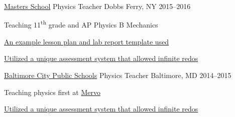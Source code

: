 \begin{cventries}
\cventry
    {\href{mastersny.org}{Masters School}}
    {Physics Teacher}
    {Dobbs Ferry, NY} {2015--2016}
    {
    \begin{cvitems}
      \item {Teaching 11\textsuperscript{th} grade and AP Physics B Mechanics}
      \item {\href{https://github.com/jphafner/physicsReport}{An example lesson plan and lab report template used}}
      \item {\href{https://github.com/jphafner/physicsAMC}{Utilized a unique assessment system that allowed infinite redos}}
    \end{cvitems}
    }

\cventry
    {\href{http://www.baltimorecityschools.org/}{Baltimore City Public Schools}}
    {Physics Teacher}
    {Baltimore, MD} {2014--2015}
    {
    \begin{cvitems}
      \item {Teaching physics first at \href{http://mervo.org}{Mervo}}
      \item {\href{https://github.com/jphafner/physicsAMC}{Utilized a unique assessment system that allowed infinite redos}}
    \end{cvitems}
    }






\end{cventries}
